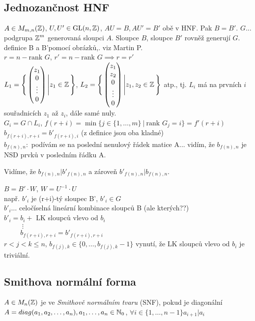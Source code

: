 \subsection{Jednozančnost HNF}
$A\in M_{m,n}(\operatorname{\mathbb{Z}})$, $U, U'\in\operatorname{GL}(n,\operatorname{\mathbb{Z}})$, $AU=B, AU'=B'$ obě v HNF. Pak $B=B'$.
$G$... podgrupa $\operatorname{\mathbb{Z}}^m$ generovaná sloupci $A$. Sloupce $B$, sloupce $B'$ rovněž generují $G$.\\
\newline
definice B a B'pomocí obrázků,. viz Martin P.\\
\newline
$r=n-\text{rank } G$, $r'=n-\text{rank } G\implies r=r'$\\
$L_1=\Bigg\{\begin{pmatrix} z_1 \\ 0 \\ \vdots \\ 0 \end{pmatrix}\Bigg|z_1\in\operatorname{\mathbb{Z}}\Bigg\}$, $L_2=\Bigg\{\begin{pmatrix} z_1 \\ z_2 \\ 0 \\ \vdots \\ 0 \end{pmatrix}\Bigg|z_1,z_2\in\operatorname{\mathbb{Z}}\Bigg\}$ atp., tj. $L_i$ má na prvních $i$ souřadnicích $z_1$ až $z_i$, dále samé nuly.\\
$G_i=G\cap L_i$, $f(r+i)=\min\{j\in\{1,\ldots,m\}\ |\ \text{rank } G_j=i\}=f'(r+i)$\\
$b_{f(r+i),r+i}=b'_{f(r+i),i}$ (z definice jsou oba kladné)\\
$b_{f(n),n}:$ podívám se na poslední nenulový řádek matice A... vidím, že $b_{f(n),n}$ je NSD
prvků v posledním řádku A.

Vidíme, že $b_{f(n),n}|b'_{f(n),n}$ a zároveň $b'_{f(n),n}|b_{f(n),n}$.

$B=B'\cdot W$, $W=U^{-1}\cdot U$\\
např. $b'_i$ je (r+i)-tý sloupec B', $b'_i\in G$\\
$b'_i\ldots$ celočíselná lineární kombinace sloupců B (ale kterých??)\\
$b'_i=b_i+$ LK sloupců vlevo od $b_i$\\
$\phantom{b'_i=.}\vdots$\\
$\phantom{b'_i=}b_{f(r+i),r+i}= b'_{f(r+i),r+i}$ \\

$r<j<k\leq n$, $b_{f(j),k}\in\{0,\ldots,b_{f(j),k}-1\}$ vynutí, že LK sloupců vlevo od $b_i$ je triviální.
\subsection{Smithova normální forma}
\begin{definition}
$A\in M_{n}(\operatorname{\mathbb{Z}})$ je ve \emph{Smithově normálním tvaru} (SNF), pokud je diagonální $A=diag(a_1,a_2,\ldots,a_n), a_1,\ldots,a_n\in \operatorname{\mathbb{N}}_0$, $\forall i\in\{1,\ldots,n-1\} a_{i+1}|a_i$
\end{definition}

